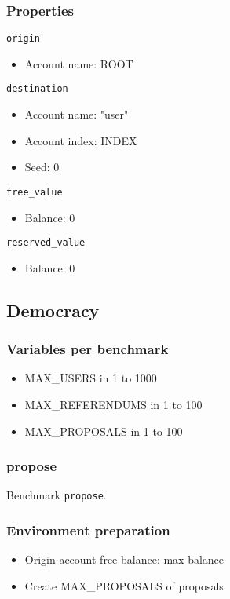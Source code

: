 \documentclass[11pt,a4paper]{article}
\begin{document}
\subsubsection*{Properties}
\verb|origin|
\begin{itemize}
    \item Account name: ROOT
\end{itemize}
\verb|destination|
\begin{itemize}
    \item Account name: "user"
    \item Account index: INDEX
    \item Seed: 0
\end{itemize}
\verb|free_value|
\begin{itemize}
    \item Balance: 0
\end{itemize}
\verb|reserved_value|
\begin{itemize}
    \item Balance: 0
\end{itemize}

\subsection{Democracy}

\subsubsection*{Variables per benchmark}
\begin{itemize}
\item MAX\_USERS in 1 to 1000
\item MAX\_REFERENDUMS in 1 to 100
\item MAX\_PROPOSALS in 1 to 100
\end{itemize}

\subsubsection{propose}

Benchmark \verb|propose|.

\subsubsection*{Environment preparation}
\begin{itemize}
    \item Origin account free balance: max balance
    \item Create MAX\_PROPOSALS of proposals
\end{itemize}
\end{document}
